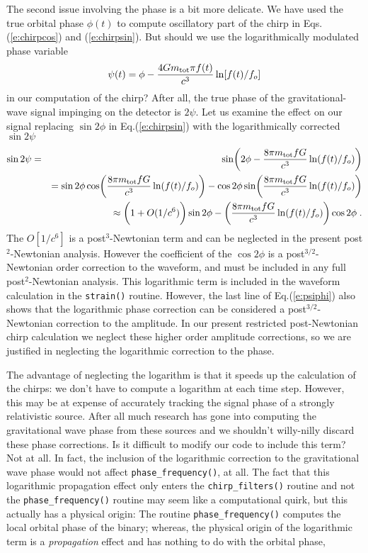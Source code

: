 The second issue involving the phase is a bit more delicate. 
We have used the true orbital phase $\phi(t)$ to
compute oscillatory part of the chirp in 
Eqs.(\ref{e:chirpcos}) and (\ref{e:chirpsin}). 
But should we use the logarithmically  modulated phase variable
\begin{equation}
\label{e:psidef}
\psi (t) = \phi - { 4 G m_{\rm tot} \pi f(t) \over c^3} \ln[f(t)/f_o] 
\end{equation}
in our computation of the chirp?
After all, the true  phase of the gravitational-wave signal
impinging on the detector is $2\psi$.
Let us examine the effect on our signal
replacing $\sin 2 \phi$ in Eq.(\ref{e:chirpsin})
with the logarithmically corrected  $\sin 2 \psi$
\begin{eqnarray}
\label{e:psiphi}
\sin 2 \psi &=& \sin \biggl ( 2\phi-{8\pi m_{\rm tot} f G \over c^3} \ln(f(t)/f_o) \biggr)
\nonumber \\
&& =  \sin 2 \phi  \cos \biggl ( {8\pi m_{\rm tot} f G \over c^3}  \ln(f(t)/f_o) \biggr )
   -  \cos 2 \phi  \sin \biggl ( {8\pi m_{\rm tot} f G \over c^3}  \ln(f(t)/f_o) \biggr )
\nonumber \\
&& \approx \biggl ( 1 +O(1/c^6) \biggr ) \sin 2 \phi
         - \biggl ( {8\pi m_{\rm tot} f G \over c^3} \ln(f(t)/f_o) \biggr )\cos 2\phi \; .
\end{eqnarray}
The $O[1/c^6]$ is a post$^3$-Newtonian term and can be neglected in
the present  post$^2$-Newtonian analysis.
However the coefficient of the $\cos 2 \phi$ is a post$^{3/2}$-Newtonian
order correction to the waveform, and must be included in
any full post$^2$-Newtonian analysis. 
This logarithmic term is included in the waveform calculation 
in the {\tt strain()} routine.
However, the last line of Eq.(\ref{e:psiphi}) also shows that the logarithmic
phase correction
can be considered a post$^{3/2}$-Newtonian correction to the amplitude.
In our present restricted post-Newtonian chirp calculation we
neglect these higher order amplitude corrections,
so we are justified in neglecting the logarithmic correction to  the phase.

The advantage of neglecting the logarithm is that it speeds up the 
calculation of the chirps: we don't have to compute a logarithm at
each time step. However, this may be at expense of accurately tracking
the signal phase of a strongly relativistic source. After all much research has
gone into computing the gravitational wave phase from these
sources and we shouldn't willy-nilly discard these phase corrections.
Is it difficult to modify our code to include this term?
Not at all.  
In fact, the inclusion of the logarithmic correction
to the gravitational wave phase would not affect
{\tt phase\_frequency()}, at all.
The fact that this logarithmic propagation 
effect only enters the {\tt chirp\_filters()} routine
and not the {\tt phase\_frequency()} routine
may seem like a computational quirk, but this actually has
a physical origin:
The routine {\tt phase\_frequency()} computes the local orbital
phase of the binary;
whereas, the physical origin of the logarithmic term is a {\it propagation}
effect and has nothing to do with the orbital phase,

